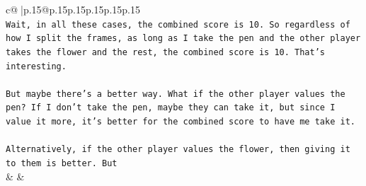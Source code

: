 \documentclass{article}
\begin{document}
{\begin{supertabular}{c@{$\;$}|p{.15\linewidth}@{}p{.15\linewidth}p{.15\linewidth}p{.15\linewidth}p{.15\linewidth}p{.15\linewidth}}
{{{\\ 
\texttt{Wait, in all these cases, the combined score is 10. So regardless of how I split the frames, as long as I take the pen and the other player takes the flower and the rest, the combined score is 10. That's interesting. } \\
\\ 
\texttt{But maybe there's a better way. What if the other player values the pen? If I don't take the pen, maybe they can take it, but since I value it more, it's better for the combined score to have me take it. } \\
\\ 
\texttt{Alternatively, if the other player values the flower, then giving it to them is better. But} \\
            }
        }
    }
    & & \\ \\


\end{supertabular}}
\end{document}
